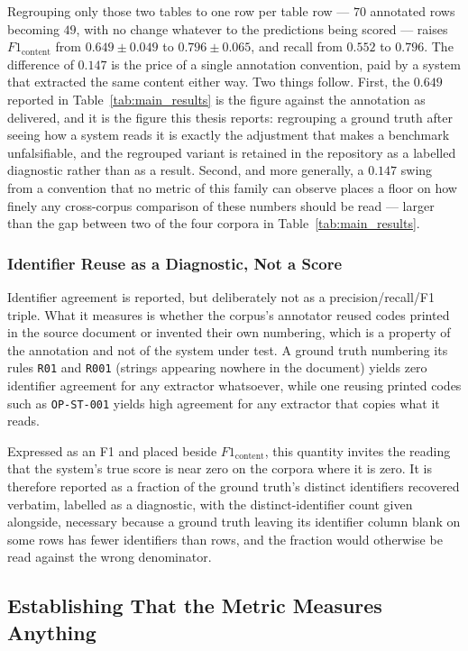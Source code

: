 \documentclass[11pt]{article}
\begin{document}
Regrouping only those two tables to one row per table row --- $70$ annotated
rows becoming $49$, with no change whatever to the predictions being scored ---
raises $F1_{\text{content}}$ from $0.649 \pm 0.049$ to $0.796 \pm 0.065$, and
recall from $0.552$ to $0.796$. The difference of $0.147$ is the price of a
single annotation convention, paid by a system that extracted the same content
either way. Two things follow. First, the $0.649$ reported in
Table~\ref{tab:main_results} is the figure against the annotation as delivered,
and it is the figure this thesis reports: regrouping a ground truth after seeing
how a system reads it is exactly the adjustment that makes a benchmark
unfalsifiable, and the regrouped variant is retained in the repository as a
labelled diagnostic rather than as a result. Second, and more generally, a
$0.147$ swing from a convention that no metric of this family can observe places
a floor on how finely any cross-corpus comparison of these numbers should be
read --- larger than the gap between two of the four corpora in
Table~\ref{tab:main_results}.

\subsubsection{Identifier Reuse as a Diagnostic, Not a Score}
\label{sec:id_reuse}
Identifier agreement is reported, but deliberately not as a precision/recall/F1
triple. What it measures is whether the corpus's annotator reused codes printed
in the source document or invented their own numbering, which is a property of
the annotation and not of the system under test. A ground truth numbering its
rules \texttt{R01} and \texttt{R001} (strings appearing nowhere in the
document) yields zero identifier agreement for any extractor whatsoever, while
one reusing printed codes such as \texttt{OP-ST-001} yields high agreement for
any extractor that copies what it reads.

Expressed as an F1 and placed beside $F1_{\text{content}}$, this quantity invites
the reading that the system's true score is near zero on the corpora where it
is zero. It is therefore reported as a fraction of the ground truth's distinct
identifiers recovered verbatim, labelled as a diagnostic, with the distinct-identifier
count given alongside, necessary because a ground truth leaving its identifier
column blank on some rows has fewer identifiers than rows, and the fraction would
otherwise be read against the wrong denominator.

\subsection{Establishing That the Metric Measures Anything}
\label{sec:metric_validity}
\end{document}
